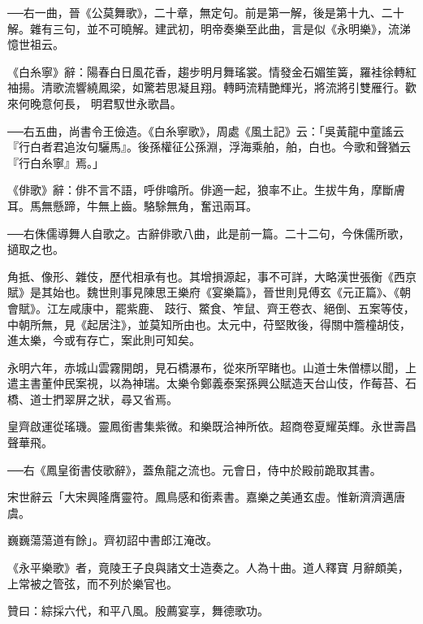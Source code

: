 \begin{pinyinscope}
 ──右一曲，晉《公莫舞歌》，二十章，無定句。前是第一解，後是第十九、二十解。雜有三句，並不可曉解。建武初，明帝奏樂至此曲，言是似《永明樂》，流涕憶世祖云。



 《白糸寧》辭：陽春白日風花香，趨步明月舞瑤裳。情發金石媚笙簧，羅袿徐轉紅袖揚。清歌流響繞鳳梁，如驚若思凝且翔。轉眄流精艷輝光，將流將引雙雁行。歡來何晚意何長，
 明君馭世永歌昌。



 ──右五曲，尚書令王儉造。《白糸寧歌》，周處《風土記》云：「吳黃龍中童謠云『行白者君追汝句驪馬』。後孫權征公孫淵，浮海乘舶，舶，白也。今歌和聲猶云『行白糸寧』焉。」



 《俳歌》辭：俳不言不語，呼俳噏所。俳適一起，狼率不止。生拔牛角，摩斷膚耳。馬無懸蹄，牛無上齒。駱駼無角，奮迅兩耳。



 ──右侏儒導舞人自歌之。古辭俳歌八曲，此是前一篇。二十二句，今侏儒所歌，擿取之也。



 角抵、像形、雜伎，歷代相承有也。其增損源起，事不可詳，大略漢世張衡《西京賦》是其始也。魏世則事見陳思王樂府《宴樂篇》，晉世則見傅玄《元正篇》、《朝會賦》。江左咸康中，罷紫鹿、
 跂行、鱉食、笮鼠、齊王卷衣、絕倒、五案等伎，中朝所無，見《起居注》，並莫知所由也。太元中，苻堅敗後，得關中簷橦胡伎，進太樂，今或有存亡，案此則可知矣。



 永明六年，赤城山雲霧開朗，見石橋瀑布，從來所罕睹也。山道士朱僧標以聞，上遣主書董仲民案視，以為神瑞。太樂令鄭義泰案孫興公賦造天台山伎，作莓苔、石橋、道士捫翠屏之狀，尋又省焉。



 皇齊啟運從瑤璣。靈鳳銜書集紫微。和樂既洽神所依。超商卷夏耀英輝。永世壽昌聲華飛。



 ──右《鳳皇銜書伎歌辭》，蓋魚龍之流也。元會日，侍中於殿前跪取其書。



 宋世辭云「大宋興隆膺靈符。鳳鳥感和銜素書。嘉樂之美通玄虛。惟新濟濟邁唐虞。



 巍巍蕩蕩道有餘」。齊初詔中書郎江淹改。



 《永平樂歌》者，竟陵王子良與諸文士造奏之。人為十曲。道人釋寶
 月辭頗美，上常被之管弦，而不列於樂官也。



 贊曰：綜採六代，和平八風。殷薦宴享，舞德歌功。



\end{pinyinscope}